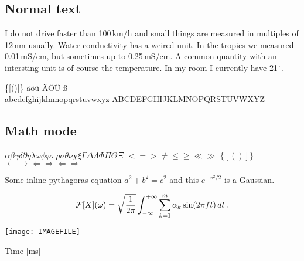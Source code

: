 \subsection{Normal text}

I do not drive faster than 100\,km/h and small things are measured in
multiples of 12\,nm usually. Water conductivity has a weired unit. In
the tropics we measured 0.01\,mS/cm, but sometimes up to
0.25\,mS/cm. A common quantity with an intersting unit is of course
the temperature. In my room I currently have 21\,$^{\circ}$.

\bigskip
{} \qquad \{[()]\} \qquad \"a\"o\"u  \"A\"O\"U {\ss} \\
abcdefghijklmnopqrstuvwxyz \qquad ABCDEFGHIJKLMNOPQRSTUVWXYZ

\subsection{Math mode}

$\alpha\beta\gamma\delta\partial\eta\lambda\omega\phi\varphi\pi\rho\sigma\theta\nu\chi\xi\Gamma\Delta\Lambda\Phi\Pi\Theta\Xi$
\qquad $<=> \ne \le \ge \ll \gg$
 \qquad $\{[()]\}$
\qquad $\leftarrow \rightarrow \Leftarrow \Rightarrow \Longleftarrow \Longrightarrow$

\bigskip
\noindent
Some inline pythagoras equation $a^2 + b^2 = c^2$ and this $e^{-x^2/2}$ is a Gaussian.

\[ {\cal F}[X](\omega) = \sqrt{\frac{1}{2\pi}}\int_{-\infty}^{+\infty} \sum_{k=1}^m \alpha_k\sin(2\pi f t)\,dt\,. \]

\noindent
\texttt{[image: IMAGEFILE]}
\centerline{Time [ms]}
